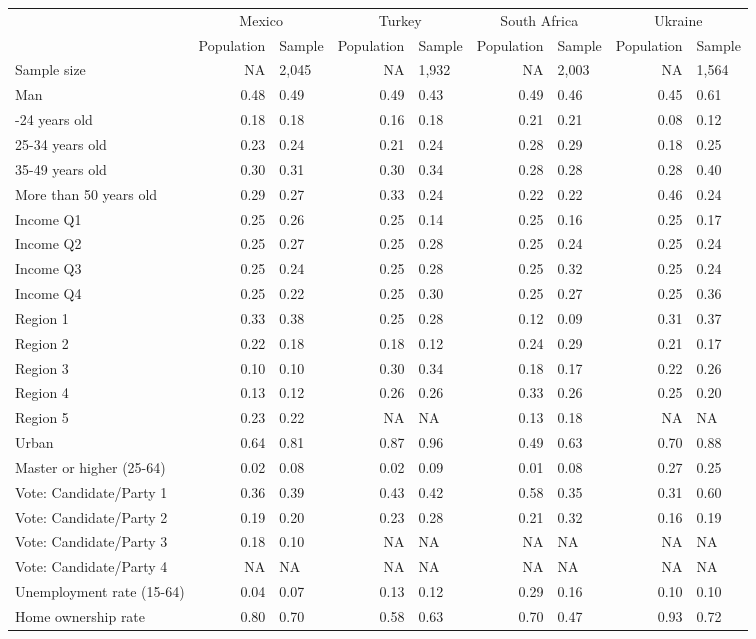 
\begin{tabular}[t]{lrlrlrlrl}
\toprule
\multicolumn{1}{c}{} & \multicolumn{2}{c}{Mexico} & \multicolumn{2}{c}{Turkey} & \multicolumn{2}{c}{South Africa} & \multicolumn{2}{c}{Ukraine} \\
\cmidrule(l{3pt}r{3pt}){2-3} \cmidrule(l{3pt}r{3pt}){4-5} \cmidrule(l{3pt}r{3pt}){6-7} \cmidrule(l{3pt}r{3pt}){8-9}
  & Population & Sample & Population & Sample & Population & Sample & Population & Sample\\
\midrule
Sample size & NA & 2,045 & NA & 1,932 & NA & 2,003 & NA & 1,564\\
\midrule
Man & 0.48 & 0.49 & 0.49 & 0.43 & 0.49 & 0.46 & 0.45 & 0.61\\
\addlinespace
18-24 years old & 0.18 & 0.18 & 0.16 & 0.18 & 0.21 & 0.21 & 0.08 & 0.12\\
25-34 years old & 0.23 & 0.24 & 0.21 & 0.24 & 0.28 & 0.29 & 0.18 & 0.25\\
35-49 years old & 0.30 & 0.31 & 0.30 & 0.34 & 0.28 & 0.28 & 0.28 & 0.40\\
More than 50 years old & 0.29 & 0.27 & 0.33 & 0.24 & 0.22 & 0.22 & 0.46 & 0.24\\
\addlinespace
Income Q1 & 0.25 & 0.26 & 0.25 & 0.14 & 0.25 & 0.16 & 0.25 & 0.17\\
Income Q2 & 0.25 & 0.27 & 0.25 & 0.28 & 0.25 & 0.24 & 0.25 & 0.24\\
Income Q3 & 0.25 & 0.24 & 0.25 & 0.28 & 0.25 & 0.32 & 0.25 & 0.24\\
Income Q4 & 0.25 & 0.22 & 0.25 & 0.30 & 0.25 & 0.27 & 0.25 & 0.36\\
\addlinespace
Region 1 & 0.33 & 0.38 & 0.25 & 0.28 & 0.12 & 0.09 & 0.31 & 0.37\\
Region 2 & 0.22 & 0.18 & 0.18 & 0.12 & 0.24 & 0.29 & 0.21 & 0.17\\
Region 3 & 0.10 & 0.10 & 0.30 & 0.34 & 0.18 & 0.17 & 0.22 & 0.26\\
Region 4 & 0.13 & 0.12 & 0.26 & 0.26 & 0.33 & 0.26 & 0.25 & 0.20\\
Region 5 & 0.23 & 0.22 & NA & NA & 0.13 & 0.18 & NA & NA\\
\addlinespace
Urban & 0.64 & 0.81 & 0.87 & 0.96 & 0.49 & 0.63 & 0.70 & 0.88\\
\addlinespace
Master or higher (25-64) & 0.02 & 0.08 & 0.02 & 0.09 & 0.01 & 0.08 & 0.27 & 0.25\\
\addlinespace
Vote: Candidate/Party 1 & 0.36 & 0.39 & 0.43 & 0.42 & 0.58 & 0.35 & 0.31 & 0.60\\
Vote: Candidate/Party 2 & 0.19 & 0.20 & 0.23 & 0.28 & 0.21 & 0.32 & 0.16 & 0.19\\
Vote: Candidate/Party 3 & 0.18 & 0.10 & NA & NA & NA & NA & NA & NA\\
Vote: Candidate/Party 4 & NA & NA & NA & NA & NA & NA & NA & NA\\
\addlinespace
Unemployment rate (15-64) & 0.04 & 0.07 & 0.13 & 0.12 & 0.29 & 0.16 & 0.10 & 0.10\\
\addlinespace
Home ownership rate & 0.80 & 0.70 & 0.58 & 0.63 & 0.70 & 0.47 & 0.93 & 0.72\\
\bottomrule
\end{tabular}